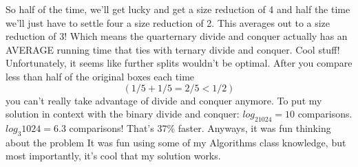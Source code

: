 \documentclass[11pt]{article}
\begin{document}
\indent So half of the time, we’ll get lucky and get a size reduction of 4 and half the time we’ll just have to settle four a size reduction of 2. This averages out to a size reduction of 3! Which means the quarternary divide and conquer actually has an AVERAGE running time that ties with ternary divide and conquer. Cool stuff! 
\indent Unfortunately, it seems like further splits wouldn’t be optimal. After you compare less than half of the original boxes each time $$(1/5 + 1/5 = 2/5 < 1/2)$$ you can’t really take advantage of divide and conquer anymore. 
\indent To put my solution in context with the binary divide and conquer: $log_21024 = 10$ comparisons. $log_3{1024} = 6.3$ comparisons! That’s 37\% faster. \newline
\indent Anyways, it was fun thinking about the problem\! It was fun using some of my Algorithms class knowledge, but most importantly, it’s cool that my solution works. 	
\end{document}
